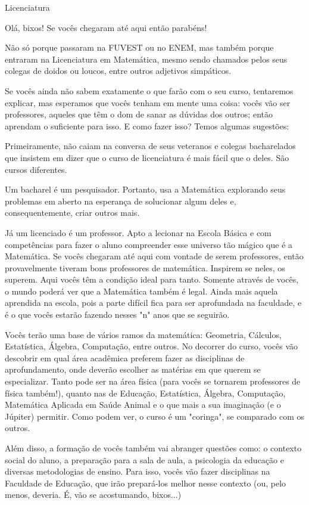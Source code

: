 \begin{subsecao}{Licenciatura}

Olá, bixos! Se vocês chegaram até aqui então parabéns!

Não só porque passaram na FUVEST ou no ENEM, mas também porque entraram na
Licenciatura em Matemática, mesmo sendo chamados pelos seus colegas de doidos ou
loucos, entre outros adjetivos simpáticos.

Se vocês ainda não sabem exatamente o que farão com o seu curso, tentaremos
explicar, mas esperamos que vocês tenham em mente uma coisa: vocês vão ser
professores, aqueles que têm o dom de sanar as dúvidas dos outros; então
aprendam o suficiente para isso. E como fazer isso? Temos algumas sugestões:

Primeiramente, não caiam na conversa de seus veteranos e colegas bacharelados
que insistem em dizer que o curso de licenciatura é mais fácil que o deles. São
cursos diferentes.

Um bacharel é um pesquisador. Portanto, usa a Matemática explorando seus
problemas em aberto na esperança de solucionar algum deles e, consequentemente,
criar outros mais.

Já um licenciado é um professor. Apto a lecionar na Escola Básica e com
competências para fazer o aluno compreender esse universo tão mágico que é a
Matemática. Se vocês chegaram até aqui com vontade de serem professores, então
provavelmente tiveram bons professores de matemática. Inspirem se neles, os
superem. Aqui vocês têm a condição ideal para tanto. Somente através de vocês, o
mundo poderá ver que a Matemática também é legal. Ainda mais aquela aprendida na
escola, pois a parte difícil fica para ser aprofundada na faculdade, e é o que
vocês estarão fazendo nesses "n" anos que se seguirão.

Vocês terão uma base de vários ramos da matemática: Geometria, Cálculos,
Estatística, Álgebra, Computação, entre outros. No decorrer do curso, vocês vão
descobrir em qual área acadêmica preferem fazer as disciplinas de
aprofundamento, onde deverão escolher as matérias em que querem se especializar.
Tanto pode ser na área física (para vocês se tornarem professores de física
também!), quanto nas de Educação, Estatística, Álgebra, Computação, Matemática
Aplicada em Saúde Animal e o que mais a sua imaginação (e o Júpiter) permitir.
Como podem ver, o curso é um "coringa", se comparado com os outros.

Além disso, a formação de vocês também vai abranger questões como: o contexto
social do aluno, a preparação para a sala de aula, a psicologia da educação e
diversas metodologias de ensino. Para isso, vocês vão fazer disciplinas na
Faculdade de Educação, que irão prepará-los melhor nesse contexto (ou, pelo
menos, deveria. É, vão se acostumando, bixos...)


\end{subsecao}
